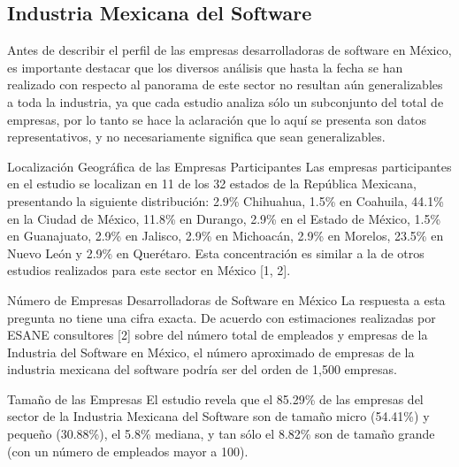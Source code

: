 \subsection{Industria Mexicana del Software}
Antes de describir el perfil de las empresas desarrolladoras de software en México, es importante destacar que los diversos análisis que hasta la fecha se han realizado con respecto al panorama de este sector no resultan aún generalizables a toda la industria, ya que cada estudio analiza sólo un subconjunto del total de empresas, por lo tanto se hace la aclaración que lo aquí se presenta son datos representativos, y no necesariamente significa que sean generalizables.

Localización Geográfica de las Empresas Participantes
Las empresas participantes en el estudio se localizan en 11 de los 32 estados de la República Mexicana, presentando la siguiente distribución: 2.9\% Chihuahua, 1.5\%  en Coahuila, 44.1\%  en la Ciudad de México, 11.8\%  en Durango, 2.9\%  en el Estado de México, 1.5\%  en Guanajuato, 2.9\%  en Jalisco, 2.9\%  en Michoacán, 2.9\%  en Morelos, 23.5\%  en Nuevo León y 2.9\%  en Querétaro. Esta concentración es similar a la de otros estudios realizados para este sector en México [1, 2].

Número de Empresas Desarrolladoras de Software en México
La respuesta a esta pregunta no tiene una cifra exacta. De acuerdo con estimaciones realizadas por ESANE consultores [2] sobre del número total de empleados y empresas de la Industria del Software en México, el número aproximado de empresas de la industria mexicana del software podría ser del orden de 1,500 empresas.

Tamaño de las Empresas
El estudio revela que el 85.29\% de las empresas del sector de la Industria Mexicana del Software son de tamaño micro (54.41\%) y pequeño (30.88\%), el 5.8\% mediana, y tan sólo el 8.82\% son de tamaño grande (con un número de empleados mayor a 100).
